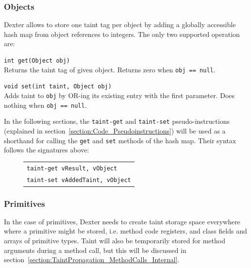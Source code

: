 \documentclass[12pt,twoside,notitlepage]{report}
\newcommand{\centerbox}[1] {
	\begin{center}
	\begin{footnotesize}
	\begin{tabular}{l}
		#1
	\end{tabular}
	\end{footnotesize}
	\end{center}
}
\newcommand{\asm}[1] {\texttt{#1}}
\begin{document}
\subsubsection{Objects}

Dexter allows to store one taint tag per object by adding a globally accessible hash map from object references to integers. The only two supported operation are:
\begin{description} 
\item \verb$int get(Object obj)$ \\
Returns the taint tag of given object. Returns zero when \verb$obj == null$.
\item \verb$void set(int taint, Object obj)$ \\
Adds taint to \verb$obj$ by OR-ing its existing entry with the first parameter. Does nothing when \verb$obj == null$.
\end{description}

In the following sections, the \verb$taint-get$ and \verb$taint-set$ pseudo-instructions (explained in section~\ref{section:Code_Pseudoinstructions}) will be used as a shorthand for calling the \verb$get$ and \verb$set$ methods of the hash map. Their syntax follows the signatures above:

	\begin{figure}[H]
		\centerbox{
			\asm{taint-get vResult, vObject} \\
			\asm{taint-set vAddedTaint, vObject}
		}
	\end{figure}

\subsubsection{Primitives}

\label{section:TaintStorage_Primitives}

In the case of primitives, Dexter needs to create taint storage space everywhere where a primitive might be stored, i.e. method code registers, and class fields and arrays of primitive types. Taint will also be temporarily stored for method arguments during a method call, but this will be discussed in section~\ref{section:TaintPropagation_MethodCalls_Internal}.
\end{document}
